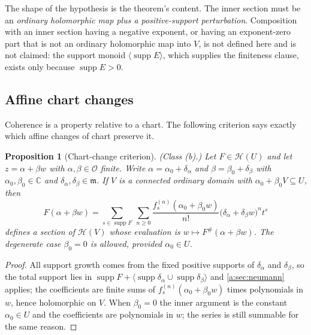 \documentclass[11pt,a4paper]{article}
\numberwithin{equation}{section}
\newtheorem{proposition}[theorem]{Proposition}
\theoremstyle{definition}
\theoremstyle{remark}
\theoremstyle{plain}
\newcommand{\CC}{\mathbb C}
\newcommand{\Ov}{\mathcal O}
\newcommand{\mm}{\mathfrak m}
\DeclareMathOperator{\supp}{supp}
\newcommand{\tm}{t}
\newcommand{\ev}[1]{#1^{\#}}
\newcommand{\Hc}{\mathcal H}
\newcommand{\Neu}[1]{\langle #1\rangle}
\begin{document}
The shape of the hypothesis is the theorem's content. The inner section
must be an \emph{ordinary holomorphic map plus a positive-support
perturbation}. Composition with an inner section having a negative
exponent, or having an exponent-zero part that is not an ordinary
holomorphic map into $V$, is not defined here and is not claimed: the
support monoid $\Neu{\supp E}$, which supplies the finiteness clause,
exists only because $\supp E>0$.

\subsection{Affine chart changes}
\label{c:p4:chart}

Coherence is a property relative to a chart. The following criterion
says exactly which affine changes of chart preserve it.

\begin{proposition}[Chart-change criterion]\label{c:p4:chartchange}
\emph{(Class (b).)} Let $F\in\Hc(U)$ and let $z=\alpha+\beta w$ with
$\alpha,\beta\in\Ov$ \emph{finite}. Write
$\alpha=\alpha_0+\delta_\alpha$ and $\beta=\beta_0+\delta_\beta$ with
$\alpha_0,\beta_0\in\CC$ and $\delta_\alpha,\delta_\beta\in\mm$. If $V$
is a connected ordinary domain with $\alpha_0+\beta_0V\subseteq U$, then
\begin{equation}\label{c:p4:eq-chartchange}
 F(\alpha+\beta w)
 =\sum_{s\in\supp F}\ \sum_{n\ge0}
   \frac{f_s^{(n)}(\alpha_0+\beta_0w)}{n!}
   \bigl(\delta_\alpha+\delta_\beta w\bigr)^{n}\tm^{s}
\end{equation}
defines a section of $\Hc(V)$ whose evaluation is
$w\mapsto\ev F(\alpha+\beta w)$. The degenerate case $\beta_0=0$ is
allowed, provided $\alpha_0\in U$.
\end{proposition}

\begin{proof}
All support growth comes from the fixed positive supports of
$\delta_\alpha$ and $\delta_\beta$, so the total support lies in
$\supp F+\Neu{\supp\delta_\alpha\cup\supp\delta_\beta}$ and
\ref{a:sec:neumann} applies; the coefficients are finite sums of
$f_s^{(n)}(\alpha_0+\beta_0w)$ times polynomials in $w$, hence
holomorphic on $V$. When $\beta_0=0$ the inner argument is the constant
$\alpha_0\in U$ and the coefficients are polynomials in $w$; the series
is still summable for the same reason.
\end{proof}
\end{document}
